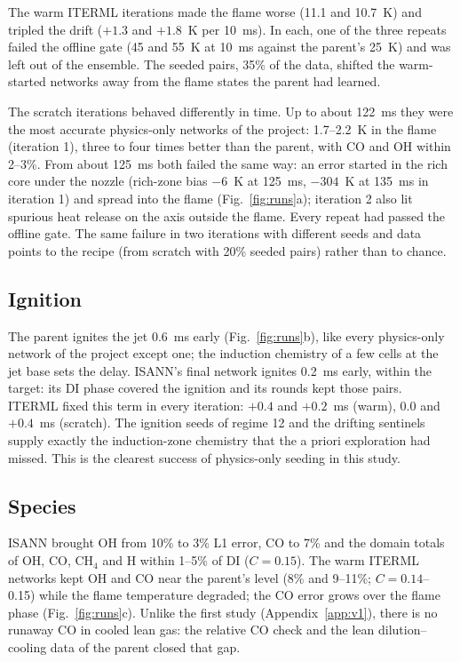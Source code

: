 \documentclass[preprint,review,12pt]{elsarticle}
\begin{document}
The warm ITERML iterations made the flame worse (11.1 and 10.7~K) and tripled the drift ($+1.3$ and
$+1.8$~K per 10~ms). In each, one of the three repeats failed the offline gate (45 and 55~K at 10~ms against
the parent's 25~K) and was left out of the ensemble. The seeded pairs, 35\% of the data, shifted the
warm-started networks away from the flame states the parent had learned.

The scratch iterations behaved differently in time. Up to about 122~ms they were the most accurate
physics-only networks of the project: 1.7--2.2~K in the flame (iteration 1), three to four times better than
the parent, with CO and OH within 2--3\%. From about 125~ms both failed the same way: an error started in the
rich core under the nozzle (rich-zone bias $-6$~K at 125~ms, $-304$~K at 135~ms in iteration 1) and spread into
the flame (Fig.~\ref{fig:runs}a); iteration 2 also lit spurious heat release on the axis outside the flame.
Every repeat had passed the offline gate. The same failure in two iterations with different seeds and data
points to the recipe (from scratch with 20\% seeded pairs) rather than to chance.

\subsection{Ignition}
\label{sec:ignition}
The parent ignites the jet 0.6~ms early (Fig.~\ref{fig:runs}b), like every physics-only network of the
project except one; the induction chemistry of a few cells at the jet base sets the delay. ISANN's final
network ignites 0.2~ms early, within the target: its DI phase covered the ignition and its rounds kept those
pairs. ITERML fixed this term in every iteration: $+0.4$ and $+0.2$~ms (warm), 0.0 and $+0.4$~ms (scratch).
The ignition seeds of regime 12 and the drifting sentinels supply exactly the induction-zone chemistry that
the a priori exploration had missed. This is the clearest success of physics-only seeding in this study.

\subsection{Species}
\label{sec:species}
ISANN brought OH from 10\% to 3\% L1 error, CO to 7\% and the domain totals of OH, CO, CH$_4$ and H within
1--5\% of DI ($C=0.15$). The warm ITERML networks kept OH and CO near the parent's level (8\% and 9--11\%;
$C=0.14$--0.15) while the flame temperature degraded; the CO error grows over the flame phase
(Fig.~\ref{fig:runs}c). Unlike the first study (Appendix~\ref{app:v1}), there is no runaway CO in cooled lean
gas: the relative CO check and the lean dilution--cooling data of the parent closed that gap.
\end{document}
